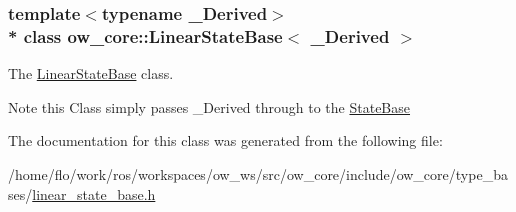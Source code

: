 \subsubsection*{template$<$typename \+\_\+\+Derived$>$\\*
class ow\+\_\+core\+::\+Linear\+State\+Base$<$ \+\_\+\+Derived $>$}

The \hyperlink{classow__core_1_1LinearStateBase}{Linear\+State\+Base} class. 

\begin{DoxyNote}{Note}
this Class simply passes \+\_\+\+Derived through to the \hyperlink{classow__core_1_1StateBase}{State\+Base} 
\end{DoxyNote}


The documentation for this class was generated from the following file\+:\begin{DoxyCompactItemize}
\item 
/home/flo/work/ros/workspaces/ow\+\_\+ws/src/ow\+\_\+core/include/ow\+\_\+core/type\+\_\+bases/\hyperlink{linear__state__base_8h}{linear\+\_\+state\+\_\+base.\+h}\end{DoxyCompactItemize}
